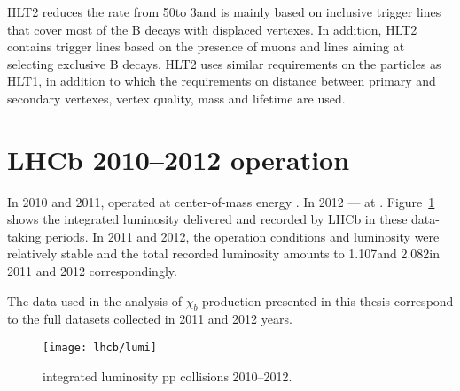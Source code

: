 HLT2 reduces the rate from 50\khz to 3\khz and is mainly based on inclusive
trigger lines that cover most of the B decays with displaced vertexes. In
addition, HLT2 contains trigger lines based on the presence of muons and lines
aiming at selecting exclusive B decays. HLT2 uses similar requirements on the
particles as HLT1, in addition to which the requirements on distance between
primary and secondary vertexes, vertex quality, mass and lifetime are used.

\section{LHCb 2010--2012 operation}

In 2010 and 2011, \lhcb operated at center-of-mass energy \tev. In 2012
--- at \tev. Figure~\ref{fig:lumi} shows the integrated luminosity
delivered and recorded by LHCb in these data-taking periods. In 2011 and 2012,
the operation conditions and luminosity were relatively stable and the total
recorded luminosity amounts to 1.107\invfb and 2.082\invfb in 2011 and 2012
correspondingly.

The data used in the analysis of $\chi_b$ production presented in this thesis
correspond to the full datasets collected in 2011 and 2012 years.

\begin{figure}[tb]
\begin{center}
\texttt{[image: lhcb/lumi]}
\end{center}
\caption{\small \lhcb integrated luminosity pp collisions 2010--2012.}
\label{fig:lumi}
\end{figure}
